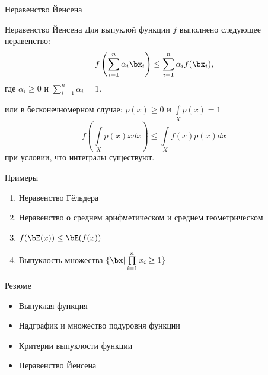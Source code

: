 \documentclass[12pt]{beamer}
\begin{document}
\begin{frame}{Неравенство Йенсена}
 
\begin{block}{Неравенство Йенсена}
Для выпуклой функции $f$ выполнено следующее неравенство:
\vspace{-4mm}
\[
f\left( \sum\limits_{i=1}^n \alpha_i \bx_i \right) \leq \sum\limits_{i=1}^n \alpha_i f(\bx_i),
\vspace{-4mm}
\] 
где $\alpha_i \geq 0$ и $\sum\limits_{i=1}^n \alpha_i = 1$.
\end{block}

или в бесконечномерном случае: $p(x) \geq 0$ и $\int\limits_X p(x) = 1$ 
\vspace{-4mm}
\[
f\left( \int\limits_X p(x)xdx \right) \leq \int\limits_X f(x)p(x)dx
\]
при условии, что интегралы существуют.

\end{frame}

\begin{frame}{Примеры}
\begin{enumerate}
\item Неравенство Гёльдера
\item Неравенство о среднем арифметическом и среднем геометрическом
\item $f(\bE(x)) \leq \bE(f(x))$
\item Выпуклость множества $\{ \bx | \prod\limits_{i=1}^n x_i \geq 1 \}$
\end{enumerate}
\end{frame}

\begin{frame}{Резюме}
\begin{itemize}
\item Выпуклая функция
\item Надграфик и множество подуровня функции
\item Критерии выпуклости функции
\item Неравенство Йенсена
\end{itemize}
\end{frame}
\end{document}

